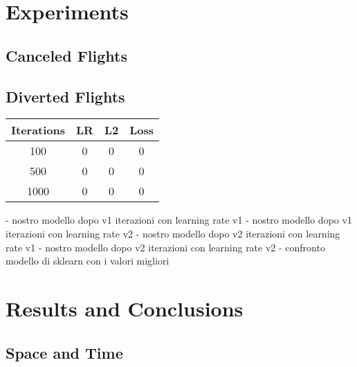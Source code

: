 \documentclass[
	letterpaper, %
	10pt, %
]{class}
\begin{document}
\section{Experiments}

\subsection{Canceled Flights}

\subsection{Diverted Flights}

\begin{center}
	\begin{tabular}{ |c|c|c|c| }
		\hline
		Iterations & LR & L2 & Loss \\
		\hline
		100        & 0  & 0  & 0    \\
		500        & 0  & 0  & 0    \\
		1000       & 0  & 0  & 0    \\
		\hline
	\end{tabular}
\end{center}

- nostro modello dopo v1 iterazioni con learning rate v1
- nostro modello dopo v1 iterazioni con learning rate v2
- nostro modello dopo v2 iterazioni con learning rate v1
- nostro modello dopo v2 iterazioni con learning rate v2
- confronto modello di sklearn con i valori migliori



\section{Results and Conclusions}

\subsection{Space and Time}



\printbibliography %

\end{document}

